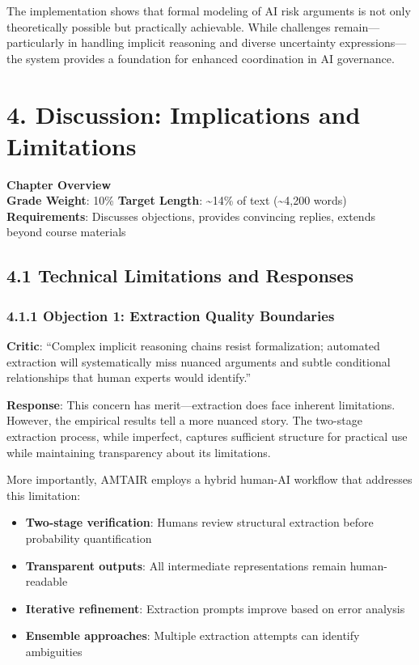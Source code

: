\documentclass[
  11pt,
  letterpaper,
]{book}
\providecommand{\tightlist}{%
  \setlength{\itemsep}{0pt}\setlength{\parskip}{0pt}}
\begin{document}
The implementation shows that formal modeling of AI risk arguments is
not only theoretically possible but practically achievable. While
challenges remain---particularly in handling implicit reasoning and
diverse uncertainty expressions---the system provides a foundation for
enhanced coordination in AI governance.


\chapter{4. Discussion: Implications and
Limitations}\label{sec-discussion}

\textbf{Chapter Overview}\\
\textbf{Grade Weight}: 10\% \textbar{} \textbf{Target Length}:
\textasciitilde14\% of text (\textasciitilde4,200 words)\\
\textbf{Requirements}: Discusses objections, provides convincing
replies, extends beyond course materials

\section{4.1 Technical Limitations and
Responses}\label{sec-technical-limitations}

\subsection{4.1.1 Objection 1: Extraction Quality
Boundaries}\label{sec-extraction-boundaries}

\textbf{Critic}: ``Complex implicit reasoning chains resist
formalization; automated extraction will systematically miss nuanced
arguments and subtle conditional relationships that human experts would
identify.''

\textbf{Response}: This concern has merit---extraction does face
inherent limitations. However, the empirical results tell a more nuanced
story. The two-stage extraction process, while imperfect, captures
sufficient structure for practical use while maintaining transparency
about its limitations.

More importantly, AMTAIR employs a hybrid human-AI workflow that
addresses this limitation:

\begin{itemize}
\tightlist
\item
  \textbf{Two-stage verification}: Humans review structural extraction
  before probability quantification
\item
  \textbf{Transparent outputs}: All intermediate representations remain
  human-readable
\item
  \textbf{Iterative refinement}: Extraction prompts improve based on
  error analysis
\item
  \textbf{Ensemble approaches}: Multiple extraction attempts can
  identify ambiguities
\end{itemize}
\end{document}
